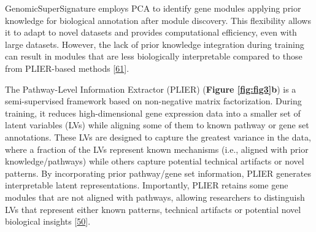 GenomicSuperSignature employs PCA to identify gene modules applying prior knowledge for biological annotation after module discovery.
This flexibility allows it to adapt to novel datasets and provides computational efficiency, even with large datasets.
However, the lack of prior knowledge integration during training can result in modules that are less biologically interpretable compared to those from PLIER-based methods {[}\protect\hyperlink{ref-X4fhSCkz}{61}{]}.

The Pathway-Level Information Extractor (PLIER) (\textbf{Figure \ref{fig:fig3}b}) is a semi-supervised framework based on non-negative matrix factorization.
During training, it reduces high-dimensional gene expression data into a smaller set of latent variables (LVs) while aligning some of them to known pathway or gene set annotations.
These LVs are designed to capture the greatest variance in the data, where a fraction of the LVs represent known mechanisms (i.e., aligned with prior knowledge/pathways) while others capture potential technical artifacts or novel patterns.
By incorporating prior pathway/gene set information, PLIER generates interpretable latent representations.
Importantly, PLIER retains some gene modules that are not aligned with pathways, allowing researchers to distinguish LVs that represent either known patterns, technical artifacts or potential novel biological insights {[}\protect\hyperlink{ref-dg9nKuy0}{50}{]}.

